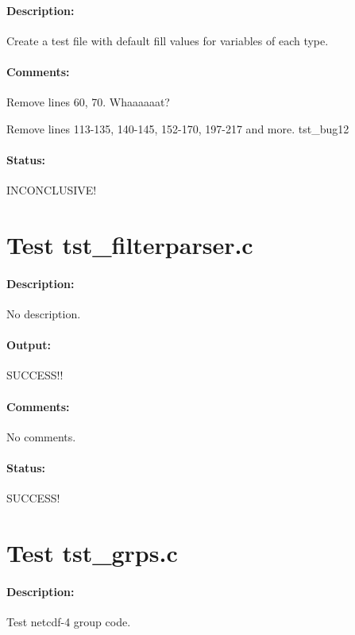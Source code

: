 \paragraph{Description:} Create a test file with default fill values for variables of each type.

\paragraph{Comments:} Remove lines 60, 70. Whaaaaaat?

Remove lines 113-135, 140-145, 152-170, 197-217 and more. tst\_bug12

\paragraph{Status:} INCONCLUSIVE!

{\color{blue}{Help, Julian!}}

\section{Test tst\_filterparser.c}

\paragraph{Description:} No description.

\paragraph{Output:} SUCCESS!!

\paragraph{Comments:} No comments.

\paragraph{Status:} SUCCESS!

\section{Test tst\_grps.c}

\paragraph{Description:} Test netcdf-4 group code.

